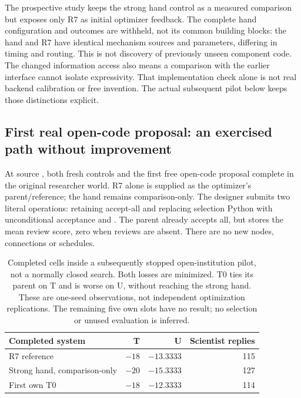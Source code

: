The prospective study keeps the strong hand control as a measured comparison
but exposes only R7 as initial optimizer feedback. The complete hand
configuration and outcomes are withheld, not its common building blocks:
the hand and R7 have identical mechanism sources and parameters, differing
in timing and routing. This is not discovery of previously unseen component
code. The changed information access also means a comparison with the earlier
interface cannot isolate expressivity.
That implementation check alone is not real backend calibration or free
invention. The actual subsequent pilot below keeps those distinctions explicit.

\subsection{First real open-code proposal: an exercised path without improvement}
At source , both fresh controls and the first free open-code
proposal complete in the original researcher world. R7 alone is supplied as
the optimizer's parent/reference; the hand remains comparison-only. The
designer submits two literal operations: retaining accept-all and replacing
selection Python with unconditional acceptance and .
The parent already accepts all, but stores the mean review score, zero when
reviews are absent. There are no new nodes, connections or schedules.

\begin{table}[htbp]
\centering\small
\begin{tabular}{lrrr}
\toprule
Completed system & T & U & Scientist replies\\
\midrule
R7 reference & $-18$ & $-13.3333$ & 115\\
Strong hand, comparison-only & $-20$ & $-15.3333$ & 127\\
First own T0 & $-18$ & $-12.3333$ & 114\\
\bottomrule
\end{tabular}
\caption{Completed cells inside a subsequently stopped open-institution
pilot, not a normally closed search. Both losses are minimized. T0 ties its
parent on T and is worse on U, without reaching the strong hand. These are
one-seed observations, not independent optimization replications. The remaining
five own slots have no result; no selection or unused evaluation is inferred.}
\label{tab:open-institution-stopped-prefix}
\end{table}

